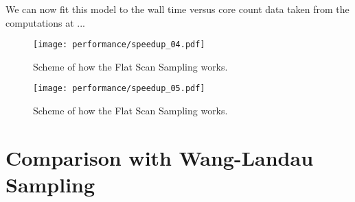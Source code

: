 	We can now fit this model to the wall time versus core count data taken from the computations at ...


\begin{figure}[h]
	\centering
	\texttt{[image: performance/speedup\_04.pdf]}
	\caption{Scheme of how the Flat Scan Sampling works.}
\end{figure}

\begin{figure}[h]
	\centering
	\texttt{[image: performance/speedup\_05.pdf]}
	\caption{Scheme of how the Flat Scan Sampling works.}
\end{figure}



\section{Comparison with Wang-Landau Sampling}

